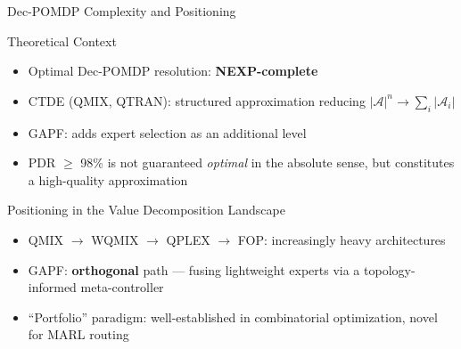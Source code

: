 \documentclass[10pt,aspectratio=169]{beamer}
\begin{document}
\begin{frame}{Dec-POMDP Complexity and Positioning}
\begin{block}{Theoretical Context}
  \begin{itemize}\small
    \item Optimal Dec-POMDP resolution: \textbf{NEXP-complete}
    \item CTDE (QMIX, QTRAN): structured approximation reducing $|\mathcal{A}|^n \to \sum_i |\mathcal{A}_i|$
    \item GAPF: adds expert selection as an additional level
    \item PDR $\geq$ 98\% is not guaranteed \emph{optimal} in the absolute sense, but constitutes a high-quality approximation
  \end{itemize}
\end{block}

\vspace{4pt}
\begin{block}{Positioning in the Value Decomposition Landscape}
  \begin{itemize}\small
    \item QMIX $\to$ WQMIX $\to$ QPLEX $\to$ FOP: increasingly heavy architectures
    \item GAPF: \textbf{orthogonal} path --- fusing lightweight experts via a topology-informed meta-controller
    \item ``Portfolio'' paradigm: well-established in combinatorial optimization, novel for MARL routing
  \end{itemize}
\end{block}
\end{frame}
\end{document}
